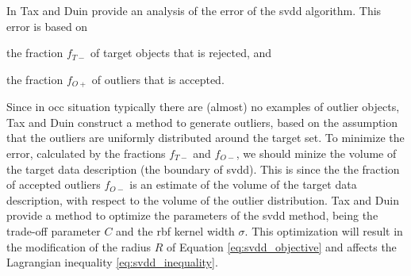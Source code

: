 In \cite{tax2002uniform} Tax and Duin provide an analysis of the error of the \gls{svdd} algorithm.
This error is based on
\begin{inparaenum}[\itshape 1\upshape)]
\item the fraction $f_{T-}$ of target objects that is rejected, and
\item the fraction $f_{O+}$ of outliers that is accepted.
\end{inparaenum}
Since in \gls{occ} situation typically there are (almost) no examples of outlier objects, Tax and Duin construct a method to generate outliers, based on the assumption that the outliers are uniformly distributed around the target set.
To minimize the error, calculated by the fractions $f_{T-}$ and $f_{O-}$, we should minize the volume of the target data description (\ie the boundary of \gls{svdd}).
This is since the the fraction of accepted outliers $f_{O-}$ is an estimate of the volume of the target data description, with respect to the volume of the outlier distribution.
Tax and Duin provide a method to optimize the parameters of the \gls{svdd} method, being the trade-off parameter $C$ and the \gls{rbf} kernel width $\sigma$.
This optimization will result in the modification of the radius $R$ of Equation \ref{eq:svdd_objective} and affects the Lagrangian inequality \ref{eq:svdd_inequality}.


